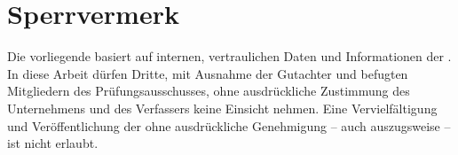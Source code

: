 \section*{Sperrvermerk}
Die vorliegende \varArbeit{} basiert auf internen, vertraulichen Daten und Informationen der \varUnternehmen. 
In diese Arbeit dürfen Dritte, mit Ausnahme der Gutachter und befugten Mitgliedern des Prüfungsausschusses, 
ohne ausdrückliche Zustimmung des Unternehmens und des Verfassers keine Einsicht nehmen. Eine Vervielfältigung 
und Veröffentlichung der \varArbeit{} ohne ausdrückliche Genehmigung – auch auszugsweise – ist nicht erlaubt.
